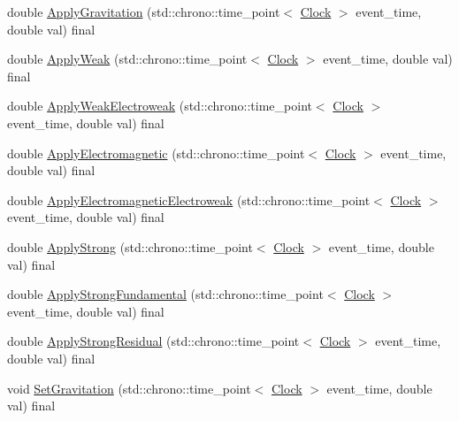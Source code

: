\begin{DoxyCompactItemize}
\item 
double \mbox{\hyperlink{classMonomer_a8747945cc2f7abd7ce0885345ad14ebc}{Apply\+Gravitation}} (std\+::chrono\+::time\+\_\+point$<$ \mbox{\hyperlink{universe_8h_a0ef8d951d1ca5ab3cfaf7ab4c7a6fd80}{Clock}} $>$ event\+\_\+time, double val) final
\item 
double \mbox{\hyperlink{classMonomer_a176a1a4dfed1eaddc6637bbfd2660aba}{Apply\+Weak}} (std\+::chrono\+::time\+\_\+point$<$ \mbox{\hyperlink{universe_8h_a0ef8d951d1ca5ab3cfaf7ab4c7a6fd80}{Clock}} $>$ event\+\_\+time, double val) final
\item 
double \mbox{\hyperlink{classMonomer_a64f65c128ebc2428c42739c930696ea1}{Apply\+Weak\+Electroweak}} (std\+::chrono\+::time\+\_\+point$<$ \mbox{\hyperlink{universe_8h_a0ef8d951d1ca5ab3cfaf7ab4c7a6fd80}{Clock}} $>$ event\+\_\+time, double val) final
\item 
double \mbox{\hyperlink{classMonomer_ae64dfbf82610ae26427be9c824aef70f}{Apply\+Electromagnetic}} (std\+::chrono\+::time\+\_\+point$<$ \mbox{\hyperlink{universe_8h_a0ef8d951d1ca5ab3cfaf7ab4c7a6fd80}{Clock}} $>$ event\+\_\+time, double val) final
\item 
double \mbox{\hyperlink{classMonomer_a4c3f9894ea57047789bec32602f033cb}{Apply\+Electromagnetic\+Electroweak}} (std\+::chrono\+::time\+\_\+point$<$ \mbox{\hyperlink{universe_8h_a0ef8d951d1ca5ab3cfaf7ab4c7a6fd80}{Clock}} $>$ event\+\_\+time, double val) final
\item 
double \mbox{\hyperlink{classMonomer_acba5091693082fdf2d28f1a5a4ae19a1}{Apply\+Strong}} (std\+::chrono\+::time\+\_\+point$<$ \mbox{\hyperlink{universe_8h_a0ef8d951d1ca5ab3cfaf7ab4c7a6fd80}{Clock}} $>$ event\+\_\+time, double val) final
\item 
double \mbox{\hyperlink{classMonomer_aa186454670f7796e196509238d419a35}{Apply\+Strong\+Fundamental}} (std\+::chrono\+::time\+\_\+point$<$ \mbox{\hyperlink{universe_8h_a0ef8d951d1ca5ab3cfaf7ab4c7a6fd80}{Clock}} $>$ event\+\_\+time, double val) final
\item 
double \mbox{\hyperlink{classMonomer_a921f7add2d446b8670513220ace6c4b2}{Apply\+Strong\+Residual}} (std\+::chrono\+::time\+\_\+point$<$ \mbox{\hyperlink{universe_8h_a0ef8d951d1ca5ab3cfaf7ab4c7a6fd80}{Clock}} $>$ event\+\_\+time, double val) final
\item 
void \mbox{\hyperlink{classMonomer_ab38d44b27a46d5630aeb5e889f927c09}{Set\+Gravitation}} (std\+::chrono\+::time\+\_\+point$<$ \mbox{\hyperlink{universe_8h_a0ef8d951d1ca5ab3cfaf7ab4c7a6fd80}{Clock}} $>$ event\+\_\+time, double val) final

\end{DoxyCompactItemize}
